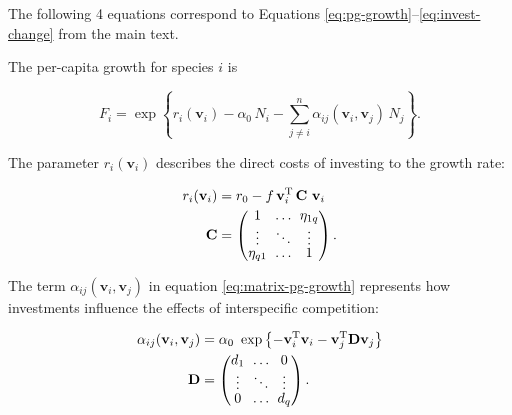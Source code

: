 The following 4 equations correspond to Equations
\ref{eq:pg-growth}--\ref{eq:invest-change} 
from the main text.

The per-capita growth for species $i$ is

\begin{equation} \label{eq:matrix-pg-growth}
    F_{i} = \exp \left\{ r_i(\mathbf{v}_i) - 
        \alpha_{0} \, N_i - \sum_{j \ne i}^{n}{
            \alpha_{ij}(\mathbf{v}_i, \mathbf{v}_j) \, N_j}  
    \right\}\textrm{.}
\end{equation}

The parameter $r_i(\mathbf{v}_i)$ describes the direct costs of investing to
the growth rate:

\begin{equation} \label{eq:matrix-growth-rate}
\begin{split}
    r_i(\mathbf{v}_i) &= r_0 - f \, \mathbf{v}_i^{\textrm{T}} \, 
        \mathbf{C} ~ \mathbf{v}_{i} \\
    \mathbf{C} &= 
        \begingroup %
        \renewcommand*{\arraystretch}{0.75}
        \setlength\arraycolsep{3pt}
        \begin{pmatrix}
        1         & \ldots & \eta_{1q} \\
        \vdots    & \ddots & \vdots \\
        \eta_{q1} & \ldots & 1      \\
        \end{pmatrix}
        \endgroup
    \textrm{.}
\end{split}
\end{equation}

\newpage{}

The term $\alpha_{ij}(\mathbf{v}_i, \mathbf{v}_j)$ in equation
\ref{eq:matrix-pg-growth}
represents how investments influence the effects
of interspecific competition:

\begin{equation} \label{eq:matrix-competition}
\begin{split}
    \alpha_{ij}(\mathbf{v}_i, \mathbf{v}_j) &= \alpha_0 ~\exp \left\{
        - \mathbf{v}_i^{\textrm{T}} \mathbf{v}_i -
        \mathbf{v}_j^{\textrm{T}} \mathbf{D} \mathbf{v}_j \right\} \\
    \mathbf{D} &= 
        \begingroup %
        \renewcommand*{\arraystretch}{0.75}
        \setlength\arraycolsep{3pt}
        \begin{pmatrix}
        d_1     & \ldots    & 0 \\
        \vdots  & \ddots    & \vdots \\
        0       & \ldots    & d_q
        \end{pmatrix}
        \endgroup
	\textrm{.}
\end{split}
\end{equation}


